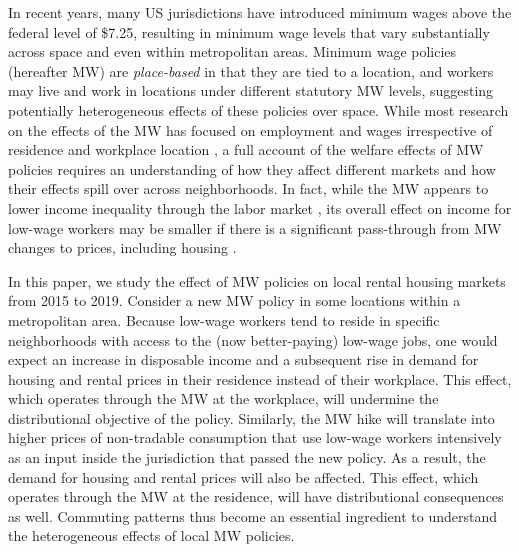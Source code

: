

In recent years, many US jurisdictions have introduced minimum wages above the 
federal level of \$7.25, resulting in minimum wage levels that vary 
substantially across space and even within metropolitan areas.
Minimum wage policies (hereafter MW) are \textit{place-based} in that they are 
tied to a location, and workers may live and work in locations under different 
statutory MW levels, suggesting potentially heterogeneous effects of these 
policies over space.
While most research on the effects of the MW has focused on employment and 
wages irrespective of residence and workplace location
\parencite[e.g.,][]{CardKrueger1994, CegnizEtAl2019},
a full account of the welfare effects of MW policies requires an understanding 
of how they affect different markets and how their effects spill over across 
neighborhoods.
In fact, while the MW appears to lower income inequality through the labor 
market \parencite{Lee1999, AutorEtAl2016},
its overall effect on income for low-wage workers may be smaller if there is 
a significant pass-through from MW changes to prices, including housing
\parencite{Macurdy2015}.

In this paper, we study the effect of MW policies on local rental housing 
markets from 2015 to 2019.
Consider a new MW policy in some locations within a metropolitan area.
Because low-wage workers tend to reside in specific neighborhoods with access 
to the (now better-paying) low-wage jobs,
one would expect an increase in disposable income and a subsequent rise in demand 
for housing and rental prices in their residence instead of their workplace.
This effect, which operates through the MW at the workplace, 
will undermine the distributional objective of the policy.
Similarly, the MW hike will translate into higher prices of non-tradable 
consumption that use low-wage workers intensively as an input inside the 
jurisdiction that passed the new policy.
As a result, the demand for housing and rental prices will also be affected.
This effect, which operates through the MW at the residence, will have 
distributional consequences as well.
Commuting patterns thus become an essential ingredient to understand the 
heterogeneous effects of local MW policies.

